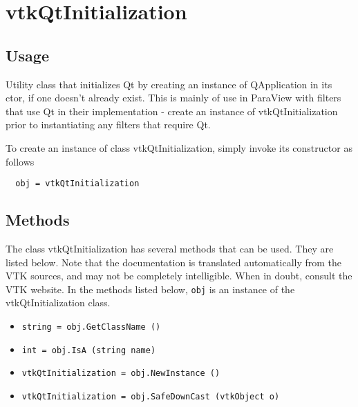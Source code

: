 \section{vtkQtInitialization}

\subsection{Usage}

 Utility class that initializes Qt by creating an instance of 
 QApplication in its ctor, if one doesn't already exist.
 This is mainly of use in ParaView with filters that use Qt in
 their implementation - create an instance of vtkQtInitialization
 prior to instantiating any filters that require Qt.

To create an instance of class vtkQtInitialization, simply
invoke its constructor as follows
\begin{verbatim}
  obj = vtkQtInitialization
\end{verbatim}
\subsection{Methods}

The class vtkQtInitialization has several methods that can be used.
  They are listed below.
Note that the documentation is translated automatically from the VTK sources,
and may not be completely intelligible.  When in doubt, consult the VTK website.
In the methods listed below, \verb|obj| is an instance of the vtkQtInitialization class.
\begin{itemize}
\item  \verb|string = obj.GetClassName ()|

\item  \verb|int = obj.IsA (string name)|

\item  \verb|vtkQtInitialization = obj.NewInstance ()|

\item  \verb|vtkQtInitialization = obj.SafeDownCast (vtkObject o)|

\end{itemize}
